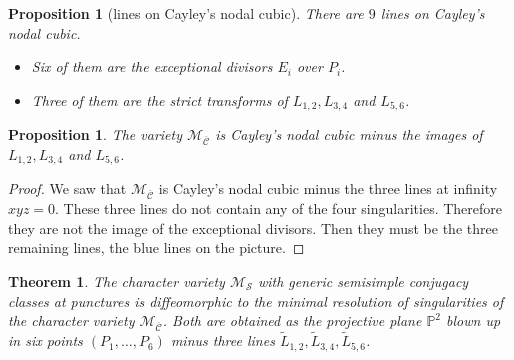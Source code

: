 \documentclass[JEP,XML,SOM,NoEqCountersInSection,Unicode,published]{cedram}
\theoremstyle{definition}
\theoremstyle{plain}
\newtheorem{theorem}[definition]{Theorem}
\newtheorem{proposition}[definition]{Proposition}
\begin{document}
\begin{proposition}[lines on Cayley's nodal cubic]\label{prop_lines_cayley}
There are $9$ lines on Cayley's nodal cubic.
\begin{itemize}
\item Six of them are the exceptional divisors $E_i$ over $P_i$.
\item Three of them are the strict transforms of $L_{1,2}, L_{3,4}$ and $L_{5,6}$.
\end{itemize}
\end{proposition}
\begin{proposition}
The variety $\mathcal{M}_{\overline{\boldsymbol{\mathcal{C}}}}$ is Cayley's nodal cubic minus the images of $L_{1,2}, L_{3,4}$ and $L_{5,6}$.
\end{proposition}
\begin{proof}
We saw that $\mathcal{M}_{\overline{\boldsymbol{\mathcal{C}}}}$ is Cayley's nodal cubic minus the three lines at infinity $xyz=0$. These three lines do not contain any of the four singularities. Therefore they are not the image of the exceptional divisors. Then they must be the three remaining lines, the blue lines on the picture.
\end{proof}
\begin{theorem}
The character variety $\mathcal{M}_{\boldsymbol{\mathcal{S}}}$ with generic semisimple conjugacy classes at punctures is diffeomorphic to the minimal resolution of singularities of the character variety $\mathcal{M}_{\overline{\boldsymbol{\mathcal{C}}}}$. Both are obtained as the projective plane $\mathbb{P}^2$ blown up in six points $(P_1,\dots,P_6)$ minus three lines $\widetilde{L}_{1,2}, \widetilde{L}_{3,4}, \widetilde{L}_{5,6}$.
\end{theorem}
\end{document}
